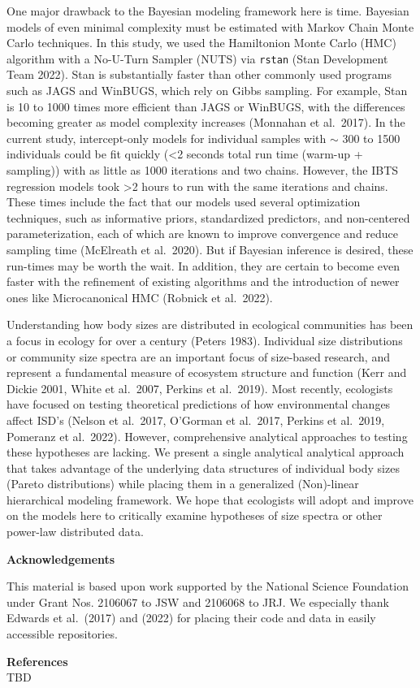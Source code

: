 \documentclass[
  12pt,
]{article}
\begin{document}
One major drawback to the Bayesian modeling framework here is time.
Bayesian models of even minimal complexity must be estimated with Markov
Chain Monte Carlo techniques. In this study, we used the Hamiltonion
Monte Carlo (HMC) algorithm with a No-U-Turn Sampler (NUTS) via
\texttt{rstan} (Stan Development Team 2022). Stan is substantially
faster than other commonly used programs such as JAGS and WinBUGS, which
rely on Gibbs sampling. For example, Stan is 10 to 1000 times more
efficient than JAGS or WinBUGS, with the differences becoming greater as
model complexity increases (Monnahan et al.~2017). In the current study,
intercept-only models for individual samples with \(\sim\) 300 to 1500
individuals could be fit quickly (\textless2 seconds total run time
(warm-up + sampling)) with as little as 1000 iterations and two chains.
However, the IBTS regression models took \textgreater2 hours to run with
the same iterations and chains. These times include the fact that our
models used several optimization techniques, such as informative priors,
standardized predictors, and non-centered parameterization, each of
which are known to improve convergence and reduce sampling time
(McElreath et al.~2020). But if Bayesian inference is desired, these
run-times may be worth the wait. In addition, they are certain to become
even faster with the refinement of existing algorithms and the
introduction of newer ones like Microcanonical HMC (Robnick et
al.~2022).

Understanding how body sizes are distributed in ecological communities
has been a focus in ecology for over a century (Peters 1983). Individual
size distributions or community size spectra are an important focus of
size-based research, and represent a fundamental measure of ecosystem
structure and function (Kerr and Dickie 2001, White et al.~2007, Perkins
et al.~2019). Most recently, ecologists have focused on testing
theoretical predictions of how environmental changes affect ISD's
(Nelson et al.~2017, O'Gorman et al.~2017, Perkins et al.~2019, Pomeranz
et al.~2022). However, comprehensive analytical approaches to testing
these hypotheses are lacking. We present a single analytical analytical
approach that takes advantage of the underlying data structures of
individual body sizes (Pareto distributions) while placing them in a
generalized (Non)-linear hierarchical modeling framework. We hope that
ecologists will adopt and improve on the models here to critically
examine hypotheses of size spectra or other power-law distributed data.

\textbf{Acknowledgements}

This material is based upon work supported by the National Science
Foundation under Grant Nos. 2106067 to JSW and 2106068 to JRJ. We
especially thank Edwards et al.~(2017) and (2022) for placing their code
and data in easily accessible repositories.

\textbf{References\\
}TBD
\end{document}
